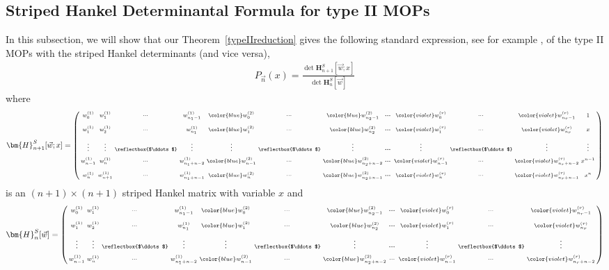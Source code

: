 \documentclass[a4paper,10pt,leqno]{amsart}
\numberwithin{equation}{section}
\theoremstyle{remark}
\newcommand{\blue}[1]{{\color{blue} #1}}
\newcommand{\violet}[1]{{\color{violet} #1}}
\begin{document}

\subsection{Striped Hankel Determinantal Formula for type II MOPs}

In this subsection, we will show that our Theorem~\ref{typeIIreduction} gives the following standard expression, see for example \cite[Equation (2.7)]{Kui10}, of the type II MOPs with the striped Hankel determinants (and vice versa),
\begin{align} \label{striped hankel det formula}
P_{\vec{n}}(x)=	\frac{\det \bm{H}^S_{n+1}[\vec{w}; x]}{\det \bm{H}^{S}_{n}[\vec{w}]}
\end{align}
where
\[
\bm{H}^{S}_{n+1}[\vec{w}; x] = \left( \begin{smallmatrix}
w_0^{(1)} & w_1^{(1)} & \cdots & w_{n_1-1}^{(1)} & \blue{w_0^{(2)}} & \cdots & \blue{w_{n_2-1}^{(2)}} & \boldsymbol \cdots & \violet{w_0^{(r)}} & \cdots & \violet{w_{n_r-1}^{(r)}} & 1 \\[6pt]
w_1^{(1)} & w_2^{(1)} & \cdots & w_{n_1}^{(1)} & \blue{w_1^{(2)}} & \cdots & \blue{w_{n_2}^{(2)}} & \boldsymbol \cdots & \violet{w_1^{(r)}} & \cdots & \violet{w_{n_r}^{(r)}} & x \\[6pt]
\vdots & \vdots & \reflectbox{$\ddots$} & \vdots & \vdots & \reflectbox{$\ddots$} & \vdots & \boldsymbol \cdots & \vdots & \reflectbox{$\ddots$} & \vdots & \vdots \\[6pt]
w_{n-1}^{(1)} & w_{n}^{(1)} & \cdots & w_{n_1+n-2}^{(1)} & \blue{w_{n-1}^{(2)}} & \cdots & \blue{w_{n_2+n-2}^{(2)}} & \boldsymbol \cdots & \violet{w_{n-1}^{(r)}} & \cdots & \violet{w_{n_r+n-2}^{(r)}} & x^{n-1} \\[6pt]
w_{n}^{(1)} & w_{n+1}^{(1)} & \cdots & w_{n_1+n-1}^{(1)} &  \blue{w_{n}^{(2)}} & \cdots & \blue{w_{n_2 + n-1}^{(2)}} & \boldsymbol \cdots & \violet{w_{n}^{(r)}} & \cdots & \violet{w_{n_r+n-1}^{(r)}} & x^{n} 
\end{smallmatrix} \right)
\]
is an $(n+1) \times (n+1)$ striped Hankel matrix with variable $x$ and
\[
\bm{H}^{S}_{n}[\vec{w}] = 
\left(
\begin{smallmatrix}
w_0^{(1)} & w_1^{(1)} & \cdots & w_{n_1-1}^{(1)} & \blue{w_0^{(2)}} & \cdots & \blue{w_{n_2-1}^{(2)}} & \boldsymbol\cdots & \violet{w_0^{(r)}} & \cdots & \violet{w_{n_r-1}^{(r)}}  \\[6pt]
w_1^{(1)} & w_2^{(1)} & \cdots & w_{n_1}^{(1)} & \blue{w_1^{(2)}} & \cdots & \blue{w_{n_2}^{(2)}} & \boldsymbol\cdots & \violet{w_1^{(r)}} & \cdots & \violet{w_{n_r}^{(r)}} \\[6pt]
\vdots & \vdots & \reflectbox{$\ddots$} & \vdots & \vdots & \reflectbox{$\ddots$} & \vdots & \boldsymbol \cdots & \vdots & \reflectbox{$\ddots$} & \vdots  \\[6pt]
w_{n-1}^{(1)} & w_{n}^{(1)} & \cdots & w_{n_1+n-2}^{(1)} & \blue{w_{n-1}^{(2)}} & \cdots & \blue{w_{n_2 + n-2}^{(2)}} & \cdots & \violet{w_{n-1}^{(r)}} & \cdots & \violet{w_{n_r+n-2}^{(r)}}
\end{smallmatrix}
\right)
\]
\end{document}
